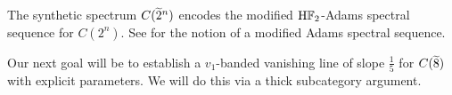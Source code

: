 

%

\begin{rmk}\label{rmk:modified-mod8}
    The synthetic spectrum $C(\wt{2}^n)$ encodes the modified $\mathrm{H}\mathbb{F}_2$-Adams spectral sequence for $C(2^n)$. See \cite[Section 3]{BHHM} for the notion of a modified Adams spectral sequence. 
\end{rmk}

Our next goal will be to establish a $v_1$-banded vanishing line of slope $\frac{1}{5}$ for $C(\wt{8})$ with explicit parameters. We will do this via a thick subcategory argument.


